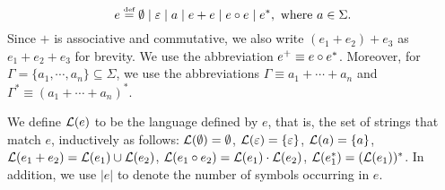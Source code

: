 {\begin{definition}
	\[e \eqdef \emptyset \mid \varepsilon \mid a \mid e + e \mid e \concat e \mid e^*, \mbox{ where } a \in \Sigma. \]
	Since $+$ is associative and commutative, we also write $(e_1 + e_2) + e_3$ as $e_1 + e_2 + e_3$ for brevity. We use the abbreviation $e^+ \equiv e \circ e^*$. Moreover, for $\Gamma = \{a_1, \cdots, a_n\}\subseteq \Sigma$, we use the abbreviations $\Gamma \equiv a_1 + \cdots + a_n$ and $\Gamma^\ast \equiv (a_1 + \cdots + a_n)^\ast$.
\end{definition}
We define $\mathcal{L}(e)$ to be the language defined by $e$, that is, the set of strings that match $e$, inductively as follows: $\mathcal{L}(\emptyset) =\emptyset$,
$\mathcal{L}(\varepsilon) =\{\varepsilon\}$,
%
$\mathcal{L}(a)= \{a\}$,
%
$\mathcal{L}(e_1 + e_2) = \mathcal{L}(e_1) \cup \mathcal{L}(e_2)$,
%
$\mathcal{L}(e_1 \circ e_2) = \mathcal{L}(e_1) \cdot \mathcal{L}(e_2)$,
%
$\mathcal{L}(e_1^*)=(\mathcal{L}(e_1))^*$.
In addition, we use $|e|$ to denote the number of symbols occurring in $e$.


}
